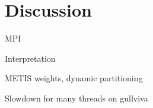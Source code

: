 \section{Discussion}
\label{sec:discussion}
MPI

Interpretation

METIS weights, dynamic partitioning

Slowdown for many threads on gullviva